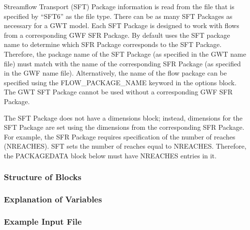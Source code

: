 Streamflow Transport (SFT) Package information is read from the file that is specified by ``SFT6'' as the file type.  There can be as many SFT Packages as necessary for a GWT model. Each SFT Package is designed to work with flows from a corresponding GWF SFR Package. By default \mf uses the SFT package name to determine which SFR Package corresponds to the SFT Package.  Therefore, the package name of the SFT Package (as specified in the GWT name file) must match with the name of the corresponding SFR Package (as specified in the GWF name file).  Alternatively, the name of the flow package can be specified using the FLOW\_PACKAGE\_NAME keyword in the options block.  The GWT SFT Package cannot be used without a corresponding GWF SFR Package.

The SFT Package does not have a dimensions block; instead, dimensions for the SFT Package are set using the dimensions from the corresponding SFR Package.  For example, the SFR Package requires specification of the number of reaches (NREACHES).  SFT sets the number of reaches equal to NREACHES.  Therefore, the PACKAGEDATA block below must have NREACHES entries in it.

\vspace{5mm}
\subsubsection{Structure of Blocks}




\vspace{5mm}
\subsubsection{Explanation of Variables}
\begin{description}

\end{description}

\vspace{5mm}
\subsubsection{Example Input File}


